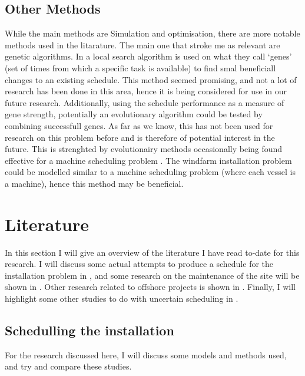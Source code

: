 \documentclass[a4paper,12pt]{article}
\begin{document}
\subsection{Other Methods} \label{ss:otmet}
While the main methods are Simulation and optimisation, there are more notable methods used in the litarature. The main one that stroke me as relevant are genetic algorithms. In \cite{kerkhove2017optimised} a local search algorithm is used on what they call `genes' (set of times from which a specific task is available) to find smal beneficiall changes to an existing schedule. This method seemed promising, and not a lot of research has been done in this area, hence it is being considered for use in our future research. Additionally, using the schedule performance as a measure of gene strength, potentially an evolutionary algorithm could be tested by combining successfull genes. As far as we know, this has not been used for research on this problem before and is therefore of potential interest in the future. This is strenghted by evolutionairy methods occasionally being found effective for a machine scheduling problem \cite{dorndorf1995evolution}. The windfarm installation problem could be modelled similar to a machine scheduling problem (where each vessel is a machine), hence this method may be beneficial.


\pagebreak

\section{Literature} \label{s:lit}
In this section I will give an overview of the literature I have read to-date for this research. I will discuss some actual attempts to produce a schedule for the installation problem in , and some research on the maintenance of the site will be shown in . Other research related to offshore projects is shown in . Finally, I will highlight some other studies to do with uncertain scheduling in .  

\subsection{Schedulling the installation} \label{ss:sched}
For the research discussed here, I will discuss some models and methods used, and try and compare these studies. 
\end{document}
